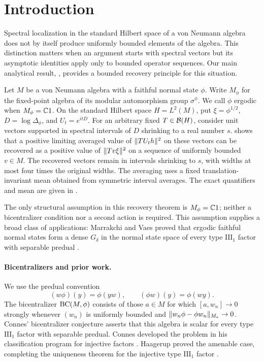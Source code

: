 \section{Introduction}

Spectral localization in the standard Hilbert space of a von Neumann
algebra does not by itself produce uniformly bounded elements of the
algebra. This distinction matters when an argument starts with spectral
vectors but its asymptotic identities apply only to bounded operator
sequences. Our main analytical result, , provides a
bounded recovery principle for this situation.

Let $M$ be a von Neumann algebra with a faithful normal state $\phi$.
Write $M_\phi$ for the fixed-point algebra of its modular automorphism
group $\sigma^\phi$. We call $\phi$ ergodic when $M_\phi=\mathbb C1$.
On the standard Hilbert space $H=L^2(M)$, put
$\xi=\phi^{1/2}$, $D=\log\Delta_\phi$, and $U_t=e^{itD}$.
For an arbitrary fixed $T\in\mathcal B(H)$, consider unit vectors supported in
spectral intervals of $D$ shrinking to a real number $s$.
 shows that a positive limiting averaged value of
$\lVert TU_th\rVert^2$ on these vectors can be recovered as a positive value of
$\lVert Tv\xi\rVert^2$ on a sequence of uniformly bounded $v\in M$.
The recovered vectors remain in intervals shrinking to $s$, with widths
at most four times the original widths. The averaging uses a fixed
translation-invariant mean obtained from symmetric interval averages.
The exact quantifiers and mean are given in
.

The only structural assumption in this recovery theorem is
$M_\phi=\mathbb C1$; neither a bicentralizer condition nor a second action is
required. This assumption supplies a broad class of applications:
Marrakchi and Vaes proved that ergodic faithful normal states form a
dense $G_\delta$ in the normal state space of every type
$\mathrm{III}_1$ factor with separable predual
\cite[Theorem~A]{MarrakchiVaes2024}.

\paragraph{Bicentralizers and prior work.}
We use the predual convention
\[
  (w\phi)(y)=\phi(yw),\qquad
  (\phi w)(y)=\phi(wy).
\]
The bicentralizer $\operatorname{BC}(M,\phi)$ consists of those $a\in M$ for which
$[a,w_n]\to0$ strongly whenever $(w_n)$ is uniformly bounded and
$\lVert w_n\phi-\phi w_n\rVert_{M_*}\to0$.
Connes' bicentralizer conjecture asserts that this algebra is scalar
for every type $\mathrm{III}_1$ factor with separable predual.
Connes developed the problem in his classification program for injective
factors \cite{Connes1980,Connes1985}. Haagerup proved the amenable case,
completing the uniqueness theorem for the injective type
$\mathrm{III}_1$ factor \cite{Haagerup1987}.

